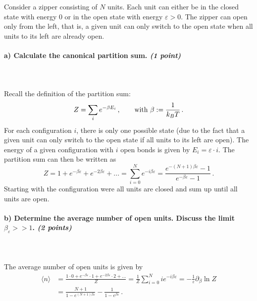 Consider a zipper consisting of $N$ units. Each unit can either be in the 
closed state with energy 0 or in the open state with energy $\varepsilon>0$.
The zipper can open only from the left, that is, a given unit can only switch
to the open state when all units to its left are already open.

\paragraph{a) Calculate the canonical partition sum. \textit{(1 point)}} \ \\
    \\
    Recall the definition of the partition sum:
    \begin{equation}
        Z=\sum_i e^{-\beta E_i}
        \,, \ \ \ \ \ \ \textnormal{with }
        \beta:=\frac{1}{k_BT} \,.
    \end{equation}
    For each configuration $i$, there is only one possible state 
    (due to the fact that a given unit can only switch to the open state if 
    all units to its left are open). The energy of a given configuration
    with $i$ open bonds is given by $E_i=\varepsilon\cdot i$. The 
    partition sum can then be written as
    \begin{equation}
        Z=1+e^{-\beta\varepsilon}+e^{-2\beta\varepsilon}+... 
        = \sum_{i=0}^N e^{-i\beta\varepsilon} 
        = \frac{e^{-(N+1)\beta\varepsilon} - 1}{e^{-\beta\varepsilon} - 1} \,.
    \end{equation}
    Starting with the configuration were all units are closed and sum up until all units
    are open.

\paragraph{b) Determine the average number of open units. Discuss the limit 
    $\beta_\varepsilon>>1$. \textit{(2 points)}} \ \\
    \\
    The average number of open units is given by
    \begin{align}
        \langle n\rangle 
        &=\frac{1\cdot 0+e^{-\beta\varepsilon}\cdot 1+e^{-2\beta\varepsilon}\cdot 2+...}{Z}
        =\frac{1}{Z} \sum_{i=0}^N i e^{-i\beta\varepsilon}
        = -\frac{1}{\varepsilon} \partial_{\beta} \ln Z \\
        &= \frac{N+1}{1-e^{(N+1)\beta\varepsilon}} - \frac{1}{1-e^{\beta\varepsilon}} \,.
    \end{align}

 
